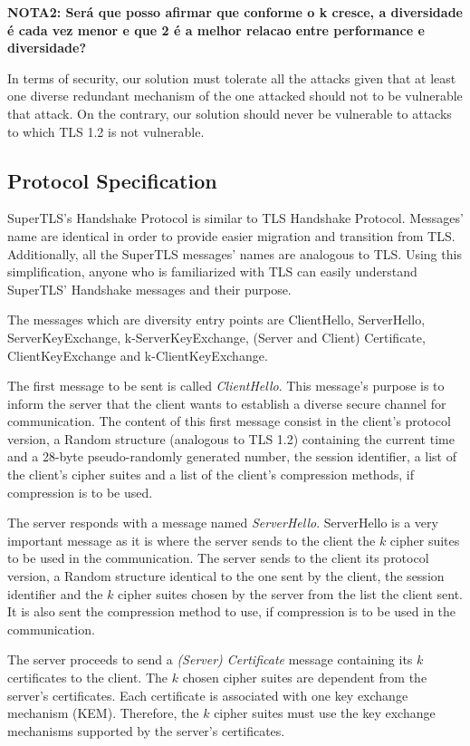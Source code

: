 \documentclass{sig-alternate-05-2015}
\begin{document}
\textbf{NOTA2: Ser\'a que posso afirmar que conforme o k cresce, a diversidade \'e cada vez menor e que 2 \'e a melhor relacao entre performance e diversidade?}

In terms of security, our solution must tolerate all the attacks given that at least one diverse redundant mechanism of the one attacked should not to be vulnerable that attack. On the contrary, our solution should never be vulnerable to attacks to which TLS 1.2 is not vulnerable.

\subsection{Protocol Specification}

SuperTLS's Handshake Protocol is similar to TLS Handshake Protocol. Messages' name are identical in order to provide easier migration and transition from TLS. Additionally, all the SuperTLS messages' names are analogous to TLS. Using this simplification, anyone who is familiarized with TLS can easily understand SuperTLS' Handshake messages and their purpose.

The messages which are diversity entry points are ClientHello, ServerHello, ServerKeyExchange, k-ServerKeyExchange, (Server and Client) Certificate, ClientKeyExchange and k-ClientKeyExchange.

The first message to be sent is called \textit{ClientHello}. This message's purpose is to inform the server that the client wants to establish a diverse secure channel for communication. The content of this first message consist in the client's protocol version, a Random structure (analogous to TLS 1.2) containing the current time and a 28-byte pseudo-randomly generated number, the session identifier, a list of the client's cipher suites and a list of the client's compression methods, if compression is to be used.

The server responds with a message named \textit{ServerHello}. ServerHello is a very important message as it is where the server sends to the client the $k$ cipher suites to be used in the communication. The server sends to the client its protocol version, a Random structure identical to the one sent by the client, the session identifier and the $k$ cipher suites chosen by the server from the list the client sent. It is also sent the compression method to use, if compression is to be used in the communication.

The server proceeds to send a \textit{(Server) Certificate} message containing its $k$ certificates to the client. The $k$ chosen cipher suites are dependent from the server's certificates. Each certificate is associated with one key exchange mechanism (KEM). Therefore, the $k$ cipher suites must use the key exchange mechanisms supported by the server's certificates.
\end{document}
